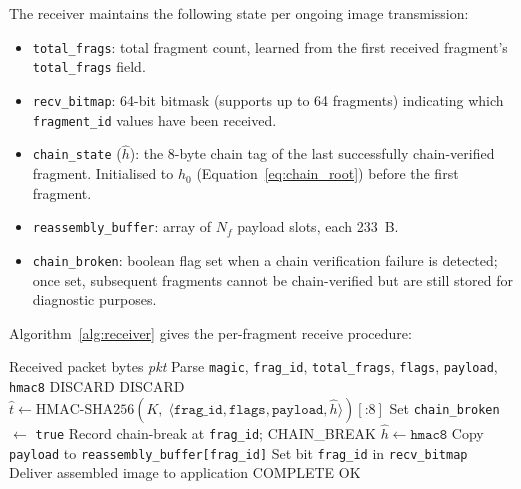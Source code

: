 \documentclass[journal]{IEEEtran}
\begin{document}
The receiver maintains the following state per ongoing image transmission:
\begin{itemize}
  \item \texttt{total\_frags}: total fragment count, learned from the first
    received fragment's \texttt{total\_frags} field.
  \item \texttt{recv\_bitmap}: 64-bit bitmask (supports up to 64 fragments)
    indicating which \texttt{fragment\_id} values have been received.
  \item \texttt{chain\_state} ($\hat{h}$): the 8-byte chain tag of the last
    successfully chain-verified fragment.  Initialised to $h_0$
    (Equation~\ref{eq:chain_root}) before the first fragment.
  \item \texttt{reassembly\_buffer}: array of $N_f$ payload slots, each 233~B.
  \item \texttt{chain\_broken}: boolean flag set when a chain verification
    failure is detected; once set, subsequent fragments cannot be
    chain-verified but are still stored for diagnostic purposes.
\end{itemize}

Algorithm~\ref{alg:receiver} gives the per-fragment receive procedure:

\begin{algorithm}[H]
\caption{FC-HMAC Fragment Reception and Chain Verification}
\label{alg:receiver}
\begin{algorithmic}[1]
\Require Received packet bytes \textit{pkt}
\State Parse \texttt{magic}, \texttt{frag\_id}, \texttt{total\_frags},
       \texttt{flags}, \texttt{payload}, \texttt{hmac8}
 \Return DISCARD \EndIf
{} \Return DISCARD \EndIf
\State $\hat{t} \leftarrow \mathrm{HMAC\text{-}SHA256}(K,\;
       \langle \texttt{frag\_id}, \texttt{flags}, \texttt{payload}, \hat{h} \rangle)[\text{:}8]$
  \State Set \texttt{chain\_broken} $\leftarrow$ \texttt{true}
  \State Record chain-break at \texttt{frag\_id}; \Return CHAIN\_BREAK
\EndIf
\State $\hat{h} \leftarrow \texttt{hmac8}$ 
\State Copy \texttt{payload} to \texttt{reassembly\_buffer[frag\_id]}
\State Set bit \texttt{frag\_id} in \texttt{recv\_bitmap}
  \State Deliver assembled image to application \Return COMPLETE
\EndIf
\Return OK
\end{algorithmic}
\end{algorithm}
\end{document}

